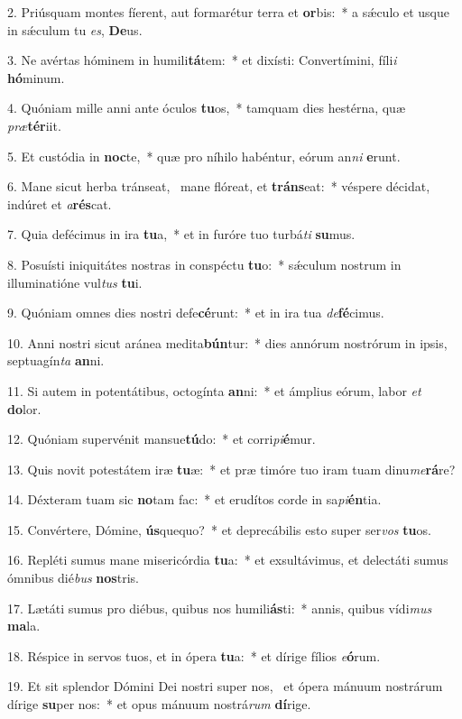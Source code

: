 2. Priúsquam montes fíerent, aut formarétur terra et \textbf{or}bis:~*  a sǽculo et usque in sǽculum tu \textit{es}, \textbf{De}us.\

3. Ne avértas hóminem in humili\textbf{tá}tem:~*  et dixísti: Convertímini, fíli\textit{i} \textbf{hó}minum.\

4. Quóniam mille anni ante óculos \textbf{tu}os,~*  tamquam dies hestérna, quæ \textit{præ}\textbf{tér}iit.\

5. Et custódia in \textbf{noc}te,~*  quæ pro níhilo habéntur, eórum an\textit{ni} \textbf{e}runt.\

6. Mane sicut herba tránseat, \dag\  mane flóreat, et \textbf{tráns}eat:~*  véspere décidat, indúret et \textit{a}\textbf{rés}cat.\

7. Quia defécimus in ira \textbf{tu}a,~*  et in furóre tuo turbá\textit{ti} \textbf{su}mus.\

8. Posuísti iniquitátes nostras in conspéctu \textbf{tu}o:~*  sǽculum nostrum in illuminatióne vul\textit{tus} \textbf{tu}i.\

9. Quóniam omnes dies nostri defe\textbf{cé}runt:~*  et in ira tua \textit{de}\textbf{fé}cimus.\

10. Anni nostri sicut aránea medita\textbf{bún}tur:~*  dies annórum nostrórum in ipsis, septuagín\textit{ta} \textbf{an}ni.\

11. Si autem in potentátibus, octogínta \textbf{an}ni:~*  et ámplius eórum, labor \textit{et} \textbf{do}lor.\

12. Quóniam supervénit mansue\textbf{tú}do:~*  et corri\textit{pi}\textbf{é}mur.\

13. Quis novit potestátem iræ \textbf{tu}æ:~*  et præ timóre tuo iram tuam dinu\textit{me}\textbf{rá}re?\

14. Déxteram tuam sic \textbf{no}tam fac:~*  et erudítos corde in sa\textit{pi}\textbf{én}tia.\

15. Convértere, Dómine, \textbf{ús}quequo?~*  et deprecábilis esto super ser\textit{vos} \textbf{tu}os.\

16. Repléti sumus mane misericórdia \textbf{tu}a:~*  et exsultávimus, et delectáti sumus ómnibus dié\textit{bus} \textbf{nos}tris.\

17. Lætáti sumus pro diébus, quibus nos humili\textbf{ás}ti:~*  annis, quibus vídi\textit{mus} \textbf{ma}la.\

18. Réspice in servos tuos, et in ópera \textbf{tu}a:~*  et dírige fílios \textit{e}\textbf{ó}rum.\

19. Et sit splendor Dómini Dei nostri super nos, \dag\  et ópera mánuum nostrárum dírige \textbf{su}per nos:~*  et opus mánuum nostrá\textit{rum} \textbf{dí}rige.\

